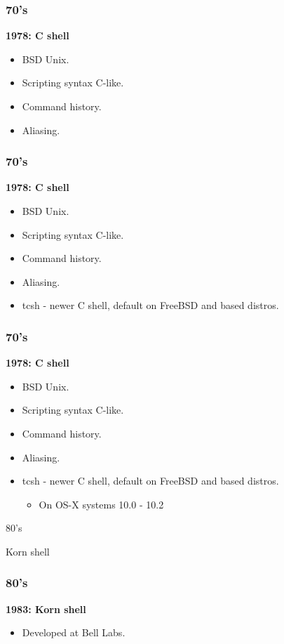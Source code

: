 \documentclass[aspectratio=169]{beamer}
\begin{document}
\begin{frame}
	\frametitle{ 70's}
	\textbf{1978: C shell}
	\begin{itemize}
		\item BSD Unix.
		\item Scripting syntax C-like. 
		\item Command history.
		\item Aliasing.
	\end{itemize}
\end{frame}

\begin{frame}
	\frametitle{ 70's}
	\textbf{1978: C shell}
	\begin{itemize}
		\item BSD Unix.
		\item Scripting syntax C-like. 
		\item Command history.
		\item Aliasing.
		\item tcsh - newer C shell, default on FreeBSD and based distros.
	\end{itemize}
\end{frame}

\begin{frame}
	\frametitle{ 70's}
	\textbf{1978: C shell}
	\begin{itemize}
		\item BSD Unix.
		\item Scripting syntax C-like. 
		\item Command history.
		\item Aliasing.
		\item tcsh - newer C shell, default on FreeBSD and based distros.
		\begin{itemize}
			\item On OS-X systems 10.0 - 10.2
		\end{itemize}
	\end{itemize}
\end{frame}


\begin{frame}
    \Huge{\centerline{80's}}
\end{frame}

\begin{frame}
    \Huge{\centerline{Korn shell}}
\end{frame}

\begin{frame}
	\frametitle{ 80's}
	\textbf{1983: Korn shell}
	\begin{itemize}
		\item Developed at Bell Labs.
	\end{itemize}
\end{frame}
\end{document}
